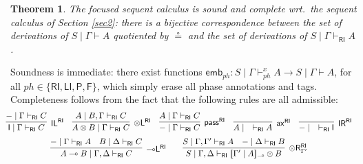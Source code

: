 \documentclass[copyright,creativecommons]{eptcs}
\newtheorem{theorem}{Theorem}[section]
\newtheorem{lemma}[theorem]{Lemma}
\theoremstyle{definition}
\newcommand{\ldbc}{[\![}
\newcommand{\rdbc}{]\!]}
\newcommand{\tl}{\otimes \mathsf{L}}
\newcommand{\tr}{\otimes \mathsf{R}}
\newcommand{\lleft}{{\multimap}\mathsf{L}}
\newcommand{\pass}{\mathsf{pass}}
\newcommand{\unitl}{\mathsf{IL}}
\newcommand{\unitr}{\mathsf{IR}}
\newcommand{\ax}{\mathsf{ax}}
\newcommand{\ot}{\otimes}
\newcommand{\lolli}{\multimap}
\newcommand{\I}{\mathsf{I}}
\newcommand{\RI}{\mathsf{RI}}
\newcommand{\LI}{\mathsf{LI}}
\newcommand{\Pass}{\mathsf{P}}
\newcommand{\F}{\mathsf{F}}
\newcommand{\SkNMILL}{$\mathtt{SkNMILL}$}
\begin{document}
 \begin{theorem}
   The focused sequent calculus is sound and complete wrt.\ the  sequent calculus of Section \ref{sec2}: there is a bijective correspondence between the set of derivations of $S \mid \Gamma \vdash A$ quotiented by $\circeq$ and the set of derivations of $S \mid \Gamma \vdash_\RI A$.
 \end{theorem}
Soundness is immediate: there exist functions $\mathsf{emb}_{ph} : S \mid \Gamma \vdash^x_{ph} A \to S \mid \Gamma \vdash A$, for all $ph \in \{\RI,\LI,\Pass, \F \}$, which simply erase all phase annotations and tags. Completeness follows from the fact that the following rules are all admissible: %
\begin{equation}\label{eq:admis}
\hspace*{-4mm}
  \begin{array}{c}
    \infer[\unitl^{\RI}]{\I \mid \Gamma \vdash_{\RI} C}{{-} \mid \Gamma \vdash_{\RI} C}
    \quad
    \infer[\tl^{\RI}]{A \ot B \mid \Gamma \vdash_{\RI} C}{A \mid B, \Gamma \vdash_{\RI} C}
    \quad
    \infer[\pass^{\RI}]{{-} \mid \Gamma \vdash_{\RI} C}{A \mid \Gamma \vdash_{\RI} C}
    \quad
    \infer[\ax^{\RI}]{A \mid \quad \vdash_{\RI} A}{}
    \quad
    \infer[\unitr^{\RI}]{{-} \mid \quad \vdash_{\RI} \I}{}
\\[6pt]
    \infer[\lleft^{\RI}]{A \lolli B \mid \Gamma , \Delta \vdash_{\RI} C}{
    {-} \mid \Gamma \vdash_{\RI} A
    &
    B \mid \Delta \vdash_{\RI} C
    }
    \qquad
    \infer[\tr_{\Gamma'}^{\RI}]{S \mid \Gamma , \Delta \vdash_{\RI} \ldbc \Gamma' \mid A \rdbc_{\lolli} \ot B}{
      S \mid \Gamma , \Gamma' \vdash_{\RI} A
      &
      {-} \mid \Delta \vdash_{\RI} B
    }
  \end{array}
\end{equation}
\end{document}
